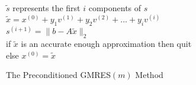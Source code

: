 \begin{figure}[tp]
\begin{center}
{{\begin{tabbing}
          $\tilde{s}$ represents the first $i$ components of $s$  \\
          $\tilde{x}=x^{(0)}+y_1 v^{(1)}+y_2 v^{(2)}+ . . . +y_i v^{(i)}$ \\
          $s^{(i+1)} = \|b-A\tilde{x}\|_2$ \\
          if $\tilde{x}$ is an accurate enough approximation then quit  \\
          else $x^{(0)}=\tilde{x}$
        \end{tabbing}
        }}
    \caption{The Preconditioned GMRES$(m)$ Method}
    \label{fig:pgmres}
  \end{center}
\end{figure}

